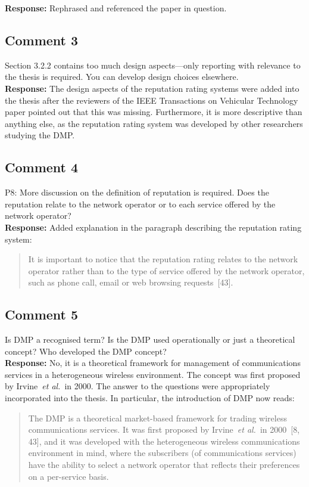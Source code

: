 \documentclass[10pt,a4paper,notitlepage]{article}
\numberwithin{equation}{section}
\begin{document}
\textbf{Response:}
Rephrased and referenced the paper in question.

\subsection{Comment 3}
Section 3.2.2 contains too much design aspects---only reporting with relevance to the thesis is required. You can develop design choices elsewhere.\\[-2ex]

\textbf{Response:}
The design aspects of the reputation rating systems were added into the thesis after the reviewers of the IEEE Transactions on Vehicular Technology paper pointed out that this was missing. Furthermore, it is more descriptive than anything else, as the reputation rating system was developed by other researchers studying the DMP.

\subsection{Comment 4}
P8: More discussion on the definition of reputation is required. Does the reputation relate to the network operator or to each service offered by the network operator?\\[-2ex]

\textbf{Response:}
Added explanation in the paragraph describing the reputation rating system:
\begin{quote}
It is important to notice that the reputation rating relates to the network operator rather than to the type of service offered by the network operator, such as phone call, email or web browsing requests~[43].
\end{quote}

\subsection{Comment 5}
Is DMP a recognised term? Is the DMP used operationally or just a theoretical concept? Who developed the DMP concept?\\[-2ex]

\textbf{Response:}
No, it is a theoretical framework for management of communications services in a heterogeneous wireless environment. The concept was first proposed by Irvine~\emph{et al.}~in 2000. The answer to the questions were appropriately incorporated into the thesis. In particular, the introduction of DMP now reads:
\begin{quote}
The DMP is a theoretical market-based framework for trading wireless communications services. It was first proposed by Irvine~\emph{et al.}~in 2000~[8, 43], and it was developed with the heterogeneous wireless communications environment in mind, where the subscribers (of communications services) have the ability to select a network operator that reflects their preferences on a per-service basis.
\end{quote}
\end{document}

